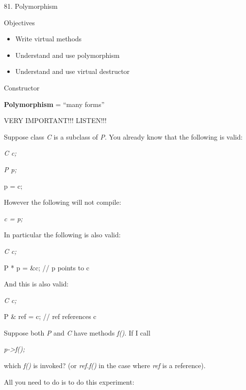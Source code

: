 \documentclass[
]{article}
\author{}
\date{}
\providecommand{\tightlist}{%
  \setlength{\itemsep}{0pt}\setlength{\parskip}{0pt}}
\begin{document}
81. Polymorphism

Objectives

\begin{itemize}
\tightlist
\item
  Write virtual methods
\item
  Understand and use polymorphism
\item
  Understand and use virtual destructor
\end{itemize}

Constructor

\textbf{Polymorphism} = ``many forms''

VERY IMPORTANT!!! LISTEN!!!

Suppose class \emph{C} is a subclass of \emph{P}. You already know that
the following is valid:

\emph{C c; }

\emph{ P p;}

p = c;

However the following will not compile:

\emph{c = p;}

In particular the following is also valid:

\emph{C c; }

P * p = \&c; // p points to c

And this is also valid:

\emph{C c; }

P \& ref = c; // ref references c

Suppose both \emph{P} and \emph{C} have methods \emph{f()}. If I call

\emph{p-\textgreater f();}

which \emph{f()} is invoked? (or \emph{ref.f()} in the case where
\emph{ref} is a reference).

All you need to do is to do this experiment:
\end{document}
